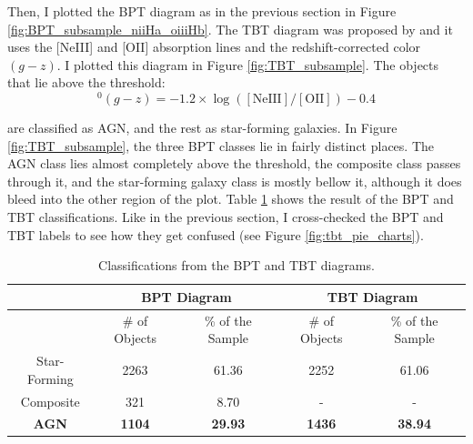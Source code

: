 \documentclass[letterpaper, oneside]{article}
\begin{document}
	Then, I plotted the BPT diagram as in the previous section in Figure \ref{fig:BPT_subsample_niiHa_oiiiHb}. The TBT diagram was proposed by \cite{TBT_2011} and it uses the [NeIII] and [OII] absorption lines and the redshift-corrected color $(g-z)$. I plotted this diagram in Figure \ref{fig:TBT_subsample}. The objects that lie above the threshold:
	\begin{equation} \label{TBT_threshold}
		^0(g-z) = -1.2 \times \log{\left(  [\text{NeIII}] / [\text{OII}] \right) } - 0.4
	\end{equation}

	\noindent are classified as AGN, and the rest as star-forming galaxies. In Figure \ref{fig:TBT_subsample}, the three BPT classes lie in fairly distinct places. The AGN class lies almost completely above the threshold, the composite class passes through it, and the star-forming galaxy class is mostly bellow it, although it does bleed into the other region of the plot. Table \ref{tab:bpt_vs_tbt_labels} shows the result of the BPT and TBT classifications. Like in the previous section, I cross-checked the BPT and TBT labels to see how they get confused (see Figure \ref{fig:tbt_pie_charts}).
	
	\begin{table}[H]
		\centering
		\begin{tabular}{c|cc|cc}
			\hline \hline
			& \multicolumn{2}{c|}{BPT Diagram} & \multicolumn{2}{c}{TBT Diagram}  \\ \hline
			& \# of Objects & \% of the Sample & \# of Objects & \% of the Sample \\ \hline
			Star-Forming & 2263         & 61.36            & 2252         & 61.06            \\
			Composite    & 321          & 8.70            & -             & -                \\
			\textbf{AGN}          & \textbf{1104}           & \textbf{29.93}             & \textbf{1436}            & \textbf{38.94}             \\ \hline
		\end{tabular}
		\caption{Classifications from the BPT and TBT diagrams.}
		\label{tab:bpt_vs_tbt_labels}
	\end{table}
\end{document}
